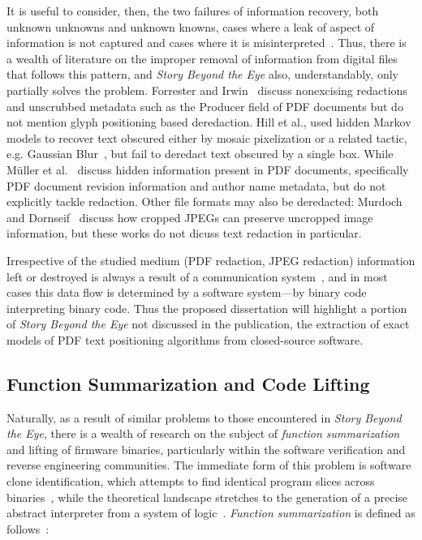 It is useful to consider, then, the two failures of information recovery, both unknown unknowns and unknown knowns, cases where a leak of aspect of information is not captured and cases where it is misinterpreted~\cite{vzivzek2004rumsfeld}.
Thus, there is a wealth of literature on the improper removal of information from digital files that follows this pattern, and \emph{Story Beyond the Eye} also, understandably, only partially solves the problem.
Forrester and Irwin~\cite{forrester2005investigation} discuss nonexcising redactions and unscrubbed metadata such as the Producer field of PDF documents but do not mention glyph positioning based deredaction.
Hill et al., used hidden Markov models to recover text obscured either by mosaic pixelization or a related tactic, e.g. Gaussian Blur~\cite{hill2016effectiveness}, but fail to deredact text obscured by a single box.
While M{\"u}ller et al.~\cite{muller2021processing} discuss hidden information present in PDF documents, specifically PDF document revision information and author name metadata, but do not explicitly tackle redaction.
Other file formats may also be deredacted: Murdoch and Dornseif~\cite{murdochmisc} discuss how cropped JPEGs can preserve uncropped image information, but these works do not dicuss text redaction in particular.

Irrespective of the studied medium (PDF redaction, JPEG redaction) information left or destroyed is always a result of a communication system~\cite{ash2012information}, and in most cases this data flow is determined by a software system---by binary code interpreting binary code.
Thus the proposed dissertation will highlight a portion of \emph{Story Beyond the Eye} not discussed in the publication, the extraction of exact models of PDF text positioning algorithms from closed-source software.

\subsection{Function Summarization and Code Lifting}

Naturally, as a result of similar problems to those encountered in \emph{Story Beyond the Eye}, there is a wealth of research on the subject of \emph{function summarization} and lifting of firmware binaries, particularly within the software verification and reverse engineering communities.
The immediate form of this problem is software clone identification, which attempts to find identical program slices across binaries~\cite{zhang2021survey}, while the theoretical landscape stretches to the generation of a precise abstract interpreter from a system of logic~\cite{thakurR12}.
\emph{Function summarization} is defined as follows~\cite{interpolation}:

